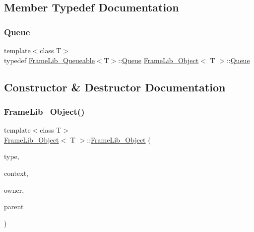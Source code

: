 \subsection{Member Typedef Documentation}
\mbox{\label{class_frame_lib___object_a481c704666e7bd901f64b2b255f79784}} 
\subsubsection{\texorpdfstring{Queue}{Queue}}
{\footnotesize\ttfamily template$<$class T$>$ \\
typedef \hyperlink{class_frame_lib___queueable}{Frame\+Lib\+\_\+\+Queueable}$<$T$>$\+::\hyperlink{class_frame_lib___object_a481c704666e7bd901f64b2b255f79784}{Queue} \hyperlink{class_frame_lib___object}{Frame\+Lib\+\_\+\+Object}$<$ T $>$\+::\hyperlink{class_frame_lib___object_a481c704666e7bd901f64b2b255f79784}{Queue}}



\subsection{Constructor \& Destructor Documentation}
\mbox{\label{class_frame_lib___object_a2a73dc92ffde31164b54f1b1f5889b77}} 
\subsubsection{\texorpdfstring{Frame\+Lib\+\_\+\+Object()}{FrameLib\_Object()}}
{\footnotesize\ttfamily template$<$class T$>$ \\
\hyperlink{class_frame_lib___object}{Frame\+Lib\+\_\+\+Object}$<$ T $>$\+::\hyperlink{class_frame_lib___object}{Frame\+Lib\+\_\+\+Object} (\begin{DoxyParamCaption}\item[{\hyperlink{_frame_lib___types_8h_a842c5e2e69277690b064bf363c017980}{Object\+Type}}]{type,  }\item[{\hyperlink{class_frame_lib___context}{Frame\+Lib\+\_\+\+Context}}]{context,  }\item[{void $\ast$}]{owner,  }\item[{T $\ast$}]{parent }\end{DoxyParamCaption})\hspace{0.3cm}{\ttfamily [inline]}}


